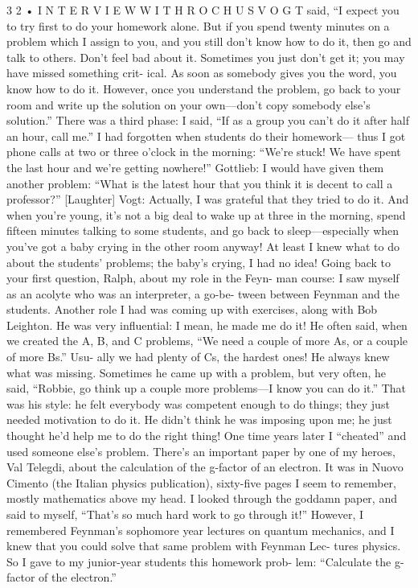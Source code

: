 \documentclass[10pt,oneside]{article}
\begin{document}
3 2 • I N T E R V I E W  W I T H  R O C H U S  V O G T said, “I expect you to try first to do your homework alone. But if you spend twenty minutes on a problem which I assign to you, and you still don’t know how to do it, then go and talk to others. Don’t feel bad about it. Sometimes you just don’t get it; you may have missed something crit- ical. As soon as somebody gives you the word, you know how to do it. However, once you understand the problem, go back to your room and write up the solution on your own---don’t copy somebody else’s solution.” There was a third phase: I said, “If as a group you can’t do it after half an hour, call me.” I had forgotten when students do their homework--- thus I got phone calls at two or three o’clock in the morning: “We’re stuck! We have spent the last hour and we’re getting nowhere!” Gottlieb: I would have given them another problem: “What is the latest hour that you think it is decent to call a professor?” [Laughter] Vogt: Actually, I was grateful that they tried to do it. And when you’re young, it’s not a big deal to wake up at three in the morning, spend fifteen minutes talking to some students, and go back to sleep---especially when you’ve got a baby crying in the other room anyway! At least I knew what to do about the students’ problems; the baby’s crying, I had no idea! Going back to your first question, Ralph, about my role in the Feyn- man course: I saw myself as an acolyte who was an interpreter, a go-be- tween between Feynman and the students. Another role I had was coming up with exercises, along with Bob Leighton. He was very influential: I mean, he made me do it! He often said, when we created the A, B, and C problems, “We need a couple of more As, or a couple of more Bs.” Usu- ally we had plenty of Cs, the hardest ones! He always knew what was missing. Sometimes he came up with a problem, but very often, he said, “Robbie, go think up a couple more problems---I know you can do it.” That was his style: he felt everybody was competent enough to do things; they just needed motivation to do it. He didn’t think he was imposing upon me; he just thought he’d help me to do the right thing! One time years later I “cheated” and used someone else’s problem. There’s an important paper by one of my heroes, Val Telegdi, about the calculation of the g-factor of an electron. It was in Nuovo Cimento (the Italian physics publication), sixty-five pages I seem to remember, mostly mathematics above my head. I looked through the goddamn paper, and said to myself, “That’s so much hard work to go through it!” However, I remembered Feynman’s sophomore year lectures on quantum mechanics, and I knew that you could solve that same problem with Feynman Lec- tures physics. So I gave to my junior-year students this homework prob- lem: “Calculate the g-factor of the electron.”\par
\end{document}
